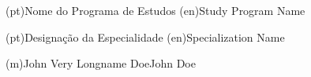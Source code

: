 \ntdegreename*(pt){Nome do Programa de Estudos}
\ntdegreename*(en){Study Program Name}



\ntspecialization*(pt){Designação da Especialidade}
\ntspecialization*(en){Specialization Name}







\ntauthorname(m){John Very Longname Doe}{John Doe}



